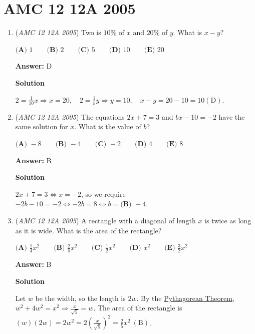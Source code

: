 \section{AMC 12 12A 2005}
        \begin{enumerate}
        	\item (\textit{AMC 12 12A 2005}) Two is $10 \%$ of $x$ and $20 \%$ of $y$. What is $x - y$?


 $\textbf{(A) } 1 \qquad \textbf{(B) } 2 \qquad \textbf{(C) } 5 \qquad \textbf{(D) } 10 \qquad \textbf{(E) } 20$

 \textbf{Answer: }D



\textbf{Solution}

$2 = \frac {1}{10}x \Longrightarrow x = 20,\quad 2 = \frac{1}{5}y \Longrightarrow y = 10,\quad x-y = 20 - 10=10  \mathrm{(D)}$.

 


	\item (\textit{AMC 12 12A 2005}) The equations $2x + 7 = 3$ and $bx - 10 = - 2$ have the same solution for $x$. What is the value of $b$?


 $\textbf{(A) } -8 \qquad \textbf{(B) } -4 \qquad \textbf{(C) } -2 \qquad \textbf{(D) } 4 \qquad \textbf{(E) } 8$

 \textbf{Answer: }B



\textbf{Solution}

$2x + 7 = 3 \iff x = -2$, so we require $-2b-10 = -2 \iff -2b = 8 \iff b = \boxed{\textbf{(B) } -4}$.

 


	\item (\textit{AMC 12 12A 2005}) A rectangle with a diagonal of length $x$ is twice as long as it is wide. What is the area of the rectangle?


 $\textbf{(A) } \frac{1}{4}x^2 \qquad \textbf{(B) } \frac{2}{5}x^2 \qquad \textbf{(C) } \frac{1}{2}x^2 \qquad \textbf{(D) } x^2 \qquad \textbf{(E) } \frac{3}{2}x^2$

 \textbf{Answer: }B



\textbf{Solution}

Let $w$ be the width, so the length is $2w$. By the \href{https://artofproblemsolving.com/wiki/index.php?title=Pythagorean\_Theorem}{Pythagorean Theorem}, $w^2 + 4w^2 = x^2 \Longrightarrow \frac{x}{\sqrt{5}} = w$. The area of the rectangle is $(w)(2w) = 2w^2 = 2\left(\frac{x}{\sqrt{5}}\right)^2 = \frac{2}{5}x^2 \ \mathrm{(B)}$.


\end{enumerate}
